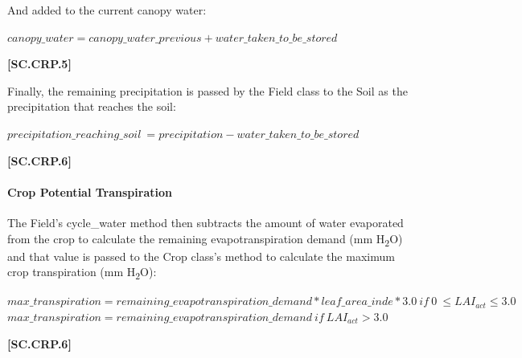 And added to the current canopy water:
    \vspace{0.2cm}

    \begin{center}
        \(canopy\_water = canopy\_water\_previous +water\_taken\_to\_be\_stored\)
    \end{center}
        \vspace{0.5cm}
    
            {\raggedleft \textbf{[SC.CRP.5]}\par}
            \vspace{0.5cm}

Finally, the remaining precipitation is passed by the Field class to the Soil as the precipitation that reaches the soil: 
    \vspace{0.2cm}

    \begin{center}
        \(precipitation\_reaching\_soil\ = precipitation - water\_taken\_to\_be\_stored\)
    \end{center}
        \vspace{0.5cm}
    
            {\raggedleft \textbf{[SC.CRP.6]}\par}
            \vspace{0.5cm}

\paragraph{Crop Potential Transpiration}
\vspace{-0.25cm}

The Field’s cycle\_water method then subtracts the amount of water evaporated from the crop to calculate the remaining evapotranspiration demand (mm H\textsubscript{2}O) and that value is passed to the Crop class’s method to calculate the maximum crop transpiration (mm H\textsubscript{2}O):
    \vspace{0.2cm}

    \begin{center}
        \(max\_transpiration=remaining\_evapotranspiration\_demand *leaf\_area\_inde * 3.0\	if\ 0\ \leq LAI_{act} \leq 3.0\) \\
        \(max\_transpiration=remaining\_evapotranspiration\_demand\ if\ LAI_{act} >3.0\)
    \end{center}
        \vspace{0.5cm}
    
            {\raggedleft \textbf{[SC.CRP.6]}\par}
            \vspace{0.5cm}



